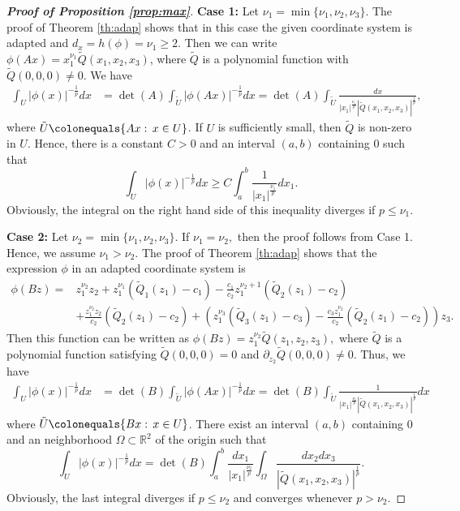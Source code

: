 \documentclass[a4paper, 11pt]{article}
\theoremstyle{plain}
\theoremstyle{definition}
\theoremstyle{lemma}
\theoremstyle{Remark}
\theoremstyle{proposition}
\theoremstyle{corollary}
\theoremstyle{example}
\theoremstyle{assumption}
\begin{document}
\begin{proof}[\textbf{Proof of Proposition \ref{prop:max}}]
\textbf{Case 1:} Let $\nu_1= \min\{\nu_1,\nu_2,\nu_3\}.$
 The proof of Theorem \ref{th:adap} shows that in this case the given coordinate system is adapted
and  $d_x=h(\phi)=\nu_1\geq 2.$ Then we can write $\phi(Ax) = x_1^{\nu_1} \tilde{Q}(x_1,x_2,x_3)$, where $\tilde{Q}$ is a polynomial function with $\tilde{Q}(0,0,0) \neq 0$.
We have
 \begin{align*}\int_U |\phi(x)|^{-\frac{1}{p}}dx&=\det(A) \int_{\tilde{U}} |\phi(Ax)|^{-\frac{1}{p}}dx
=\det(A) \int_{\tilde{U}} \frac{dx}{|x_1|^{\frac{\nu_1}{p}}|\tilde Q(x_1, x_2, x_3)|^{\frac{1}{p}}},
 \end{align*}
 where $\tilde{U}\colonequals \{Ax:\, x\in U\}$. If $U$ is sufficiently small, then  $\tilde Q$ is non-zero in $U$. Hence, there is a constant $C>0$ and an interval $(a,b)$ containing $0$ such that
 $$\int_U |\phi(x)|^{-\frac{1}{p}}dx\geq C \int_a^b \frac{1}{|x_1|^{\frac{\nu_1}{p}}}dx_1.$$ Obviously, the integral on the right hand side of this inequality  diverges if $p\leq \nu_1.$

\textbf{Case 2:}  Let $\nu_2= \min\{\nu_1,\nu_2,\nu_3\}.$ If $\nu_1=\nu_2,$ then the proof follows from Case 1. Hence, we assume $\nu_1>\nu_2.$
The proof of Theorem \ref{th:adap} shows that the expression $\phi$ in an adapted coordinate system is
  \begin{align*}
\phi(Bz)=&z_1^{\nu_2}z_2+z_1^{\nu_1}(\tilde Q_1(z_1)-c_1)-\frac{c_1}{c_2}z_1^{\nu_2+1}(\tilde Q_2(z_1)-c_2) \\& +\frac{z_1^{\nu_2}z_2}{c_2}(\tilde Q_2(z_1)-c_2)+\left(z_1^{\nu_3}(\tilde Q_3(z_1)-c_3)-\frac{c_3z_1^{\nu_2} }{c_2}(\tilde Q_2(z_1)-c_2)\right)z_3.
\end{align*}
Then this function can be written as $\phi(Bz)=z_1^{\nu_2}\tilde Q(z_1, z_2, z_3),$ where $\tilde Q$ is a polynomial function satisfying
$\tilde Q(0, 0, 0)=0$ and $\partial_{z_2} \tilde Q(0, 0, 0)\neq0$.
  Thus, we have
 \begin{align*}\int_U |\phi(x)|^{-\frac{1}{p}}dx&=\det(B) \int_{\tilde{U}} |\phi(Ax)|^{-\frac{1}{p}}dx
 =\det(B) \int_{\tilde{U}} \frac{1}{|x_1|^{\frac{\nu_2}{p}}|\tilde Q(x_1, x_2, x_3)|^{\frac{1}{p}}}dx
 \end{align*}
 where $\tilde{U}\colonequals \{Bx:\, x\in U\}$.
 There exist  an interval $(a,b)$ containing $0$ and an neighborhood $\Omega\subset \mathbb{R}^2$ of the origin such that
 $$\int_U |\phi(x)|^{-\frac{1}{p}}dx=\det(B)\int_{a}^b\frac{dx_1}{|x_1|^{\frac{\nu_2}{p}}}\int_{\Omega}  \frac{dx_2dx_3}{|\tilde Q(x_1, x_2, x_3)|^{\frac{1}{p}}}.$$
Obviously, the last integral diverges if $p\leq \nu_2$ and converges whenever $p>\nu_2$.


  \end{proof}
\end{document}
